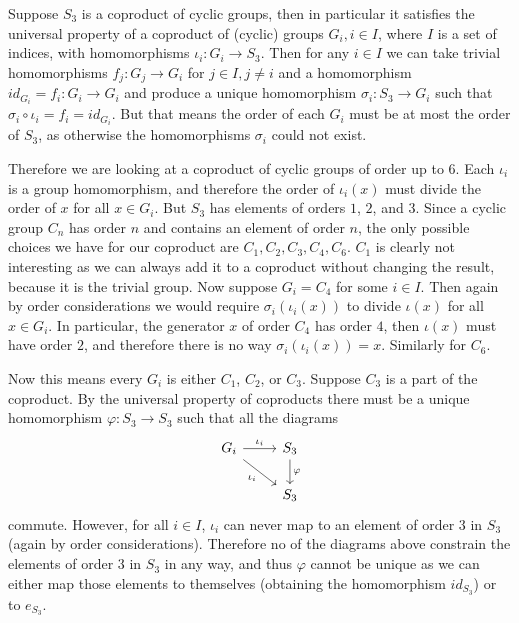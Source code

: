 \begin{solution}
	Suppose $S_3$ is a coproduct of cyclic groups, then in particular it satisfies the universal property of a coproduct of (cyclic) groups $G_i, i \in I$, where $I$ is a set of indices, with homomorphisms $\iota_i: G_i \to S_3$. Then for any $i \in I$ we can take trivial homomorphisms $f_j: G_j \to G_i$ for $j \in I, j \neq i$ and a homomorphism $id_{G_i} = f_i: G_i \to G_i$ and produce a unique homomorphism $\sigma_i: S_3 \to G_i$ such that $\sigma_i \circ \iota_i = f_i = id_{G_i}$. But that means the order of each $G_i$ must be at most the order of $S_3$, as otherwise the homomorphisms $\sigma_i$ could not exist.
	
	Therefore we are looking at a coproduct of cyclic groups of order up to $6$. Each $\iota_i$ is a group homomorphism, and therefore the order of $\iota_i(x)$ must divide the order of $x$ for all $x \in G_i$. But $S_3$ has elements of orders $1$, $2$, and $3$. Since a cyclic group $C_n$ has order $n$ and contains an element of order $n$, the only possible choices we have for our coproduct are $C_1, C_2, C_3, C_4, C_6$. $C_1$ is clearly not interesting as we can always add it to a coproduct without changing the result, because it is the trivial group. Now suppose $G_i = C_4$ for some $i \in I$. Then again by order considerations we would require $\sigma_i (\iota_i(x))$ to divide $\iota(x)$ for all $x \in G_i$. In particular, the generator $x$ of order $C_4$ has order $4$, then $\iota(x)$ must have order $2$, and therefore there is no way $\sigma_i (\iota_i(x)) = x$. Similarly for $C_6$.
	
	Now this means every $G_i$ is either $C_1$, $C_2$, or $C_3$. Suppose $C_3$ is a part of the coproduct. By the universal property of coproducts there must be a unique homomorphism $\varphi: S_3 \to S_3$ such that all the diagrams
	\begin{equation*}
		\begin{tikzcd}
			G_i
			\arrow[r, "\iota_i"]
			\arrow[dr, "\iota_i"'] &
			S_3
			\arrow[d, "\varphi"] \\
			&
			S_3
		\end{tikzcd}
	\end{equation*}
	commute. However, for all $i \in I$, $\iota_i$ can never map to an element of order $3$ in $S_3$ (again by order considerations). Therefore no of the diagrams above constrain the elements of order $3$ in $S_3$ in any way, and thus $\varphi$ cannot be unique as we can either map those elements to themselves (obtaining the homomorphism $id_{S_3}$) or to $e_{S_3}$.
	

\end{solution}
